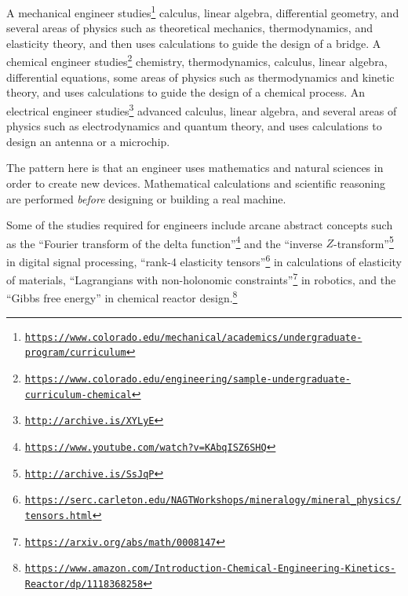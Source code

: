 A mechanical engineer studies\footnote{\texttt{\href{https://www.colorado.edu/mechanical/academics/undergraduate-program/curriculum}{https://www.colorado.edu/mechanical/academics/undergraduate-program/curriculum}}}
calculus, linear algebra, differential geometry, and several areas
of physics such as theoretical mechanics, thermodynamics, and elasticity
theory, and then uses calculations to guide the design of a bridge.
A chemical engineer studies\footnote{\texttt{\href{https://www.colorado.edu/engineering/sample-undergraduate-curriculum-chemical}{https://www.colorado.edu/engineering/sample-undergraduate-curriculum-chemical}}}
chemistry, thermodynamics, calculus, linear algebra, differential
equations, some areas of physics such as thermodynamics and kinetic
theory, and uses calculations to guide the design of a chemical process.
An electrical engineer studies\footnote{\texttt{\href{http://archive.is/XYLyE}{http://archive.is/XYLyE}}}
advanced calculus, linear algebra, and several areas of physics such
as electrodynamics and quantum theory, and uses calculations to design
an antenna or a microchip.

The pattern here is that an engineer uses mathematics and natural
sciences in order to create new devices. Mathematical calculations
and scientific reasoning are performed \emph{before} designing or
building a real machine.

Some of the studies required for engineers include arcane abstract
concepts such as the \textsf{``}Fourier transform of the delta function\textsf{''}\footnote{\texttt{\href{https://www.youtube.com/watch?v=KAbqISZ6SHQ}{https://www.youtube.com/watch?v=KAbqISZ6SHQ}}}
and the \textsf{``}inverse $Z$-transform\textsf{''}\footnote{\texttt{\href{http://archive.is/SsJqP}{http://archive.is/SsJqP}}}
in digital signal processing, \textsf{``}rank-4 elasticity tensors\textsf{''}\footnote{\texttt{\href{https://serc.carleton.edu/NAGTWorkshops/mineralogy/mineral_physics/tensors.html}{https://serc.carleton.edu/NAGTWorkshops/mineralogy/mineral\_physics/tensors.html}}}
in calculations of elasticity of materials, \textsf{``}Lagrangians with non-holonomic
constraints\textsf{''}\footnote{\texttt{\href{https://arxiv.org/abs/math/0008147}{https://arxiv.org/abs/math/0008147}}}
in robotics, and the \textsf{``}Gibbs free energy\textsf{''} in chemical reactor design.\footnote{\texttt{\href{https://www.amazon.com/Introduction-Chemical-Engineering-Kinetics-Reactor/dp/1118368258}{https://www.amazon.com/Introduction-Chemical-Engineering-Kinetics-Reactor/dp/1118368258}}}

